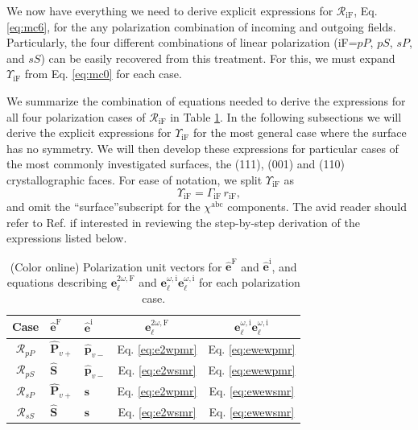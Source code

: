 \documentclass[aps,pra,10pt,amsmath,notitlepage,letterpaper]{revtex4-1}
\begin{document}
We now have everything we need to derive explicit expressions for $\mathcal{R}_{\mathrm{iF}}$, Eq. \eqref{eq:mc6}, for the any polarization combination of incoming and outgoing fields. Particularly, the four different combinations of linear polarization (iF=$pP$, $pS$, $sP$, and $sS$) can be easily recovered from this treatment. For this, we must expand $\Upsilon_{\mathrm{iF}}$ from Eq. \eqref{eq:mc0} for each case.

We summarize the combination of equations needed to derive the expressions for
all four polarization cases of $\mathcal{R}_{\mathrm{iF}}$ in Table
\ref{tab:summary}. In the following subsections we will derive the explicit
expressions for $\Upsilon_{\mathrm{iF}}$ for the most general case where the
surface has no symmetry. We will then develop these expressions for particular
cases of the most commonly investigated surfaces, the (111), (001) and (110)
crystallographic faces. For ease of notation, we split $\Upsilon_{\mathrm{iF}}$
as
\begin{equation}\label{eq:mc25}
\Upsilon_{\mathrm{iF}} = \Gamma_{\mathrm{iF}}\,r_{\mathrm{iF}},
\end{equation}
and omit the ``surface''subscript for the $\chi^{\mathrm{abc}}$ components. The
avid reader should refer to Ref. \cite{andersonthesis} if interested in
reviewing the step-by-step derivation of the expressions listed below.

\begin{table}[b]
\caption{(Color online) Polarization unit vectors for
$\hat{\mathbf{e}}^{\mathrm{F}}$ and $\hat{\mathbf{e}}^{\mathrm{i}}$, and
equations describing $\mathbf{e}^{2\omega,\mathrm{F}}_{\ell}$ and
$\mathbf{e}^{\omega,\mathrm{i}}_{\ell}\mathbf{e}^{\omega,\mathrm{i}}_{\ell}$ for
each polarization case.}
\label{tab:summary}
\centering
\begin{tabular}{| c | l | l | c | c |}
\hline
Case               & $\hat{\mathbf{e}}^{\mathrm{F}}$
                   & $\hat{\mathbf{e}}^{\mathrm{i}}$
                   & $\mathbf{e}^{2\omega,\mathrm{F}}_{\ell}$
                   & $\mathbf{e}^{\omega,\mathrm{i}}_{\ell}
                      \mathbf{e}^{\omega,\mathrm{i}}_{\ell}$ \\
\hline
$\mathcal{R}_{pP}$ & $\hat{\mathbf{P}}_{v+}$
                   & $\hat{\mathbf{p}}_{v-}$
                   &  Eq. \eqref{eq:e2wpmr} & Eq. \eqref{eq:ewewpmr} \\
$\mathcal{R}_{pS}$ & $\hat{\mathbf{S}}$
                   & $\hat{\mathbf{p}}_{v-}$
                   &  Eq. \eqref{eq:e2wsmr} & Eq. \eqref{eq:ewewpmr} \\
$\mathcal{R}_{sP}$ & $\hat{\mathbf{P}}_{v+}$
                   & $\hat{\mathbf{s}}$
                   &  Eq. \eqref{eq:e2wpmr} & Eq. \eqref{eq:ewewsmr} \\
$\mathcal{R}_{sS}$ & $\hat{\mathbf{S}}$
                   & $\hat{\mathbf{s}}$
                   &  Eq. \eqref{eq:e2wsmr} & Eq. \eqref{eq:ewewsmr} \\
\hline
\end{tabular}
\end{table}
\end{document}
